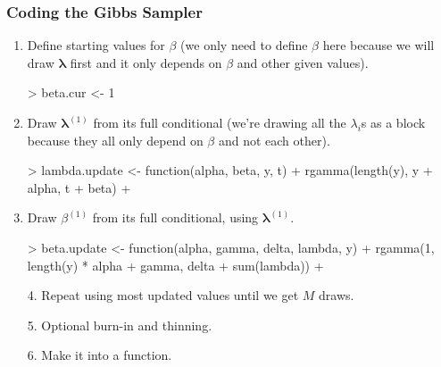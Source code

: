 \documentclass{beamer}
\begin{document}
\begin{frame}[fragile]
\frametitle{Coding the Gibbs Sampler}
\pause
\begin{enumerate}
\item Define starting values for $\beta$ \pause (we only need to define
$\beta$ here because we will draw $\bm{\lambda}$ first and it only
depends on $\beta$ and other given values).
\pause
\tiny
\medskip
\begin{Schunk}
\begin{Sinput}
> beta.cur <- 1
\end{Sinput}
\end{Schunk}
\bigskip
\normalsize
\pause
\item Draw $\bm{\lambda}^{(1)}$ from its full conditional \pause (we're
drawing all the $\lambda_i$s as a block because they all only depend
on $\beta$ and not each other). 
\tiny
\medskip
\pause
\begin{Schunk}
\begin{Sinput}
> lambda.update <- function(alpha, beta, y, t) {
+     rgamma(length(y), y + alpha, t + beta)
+ }
\end{Sinput}
\end{Schunk}
\normalsize
\bigskip
\pause
\item Draw $\beta^{(1)}$ from its full conditional, using $\bm{\lambda}^{(1)}$.
\medskip
\tiny
\pause
\begin{Schunk}
\begin{Sinput}
> beta.update <- function(alpha, gamma, delta, lambda, y) {
+     rgamma(1, length(y) * alpha + gamma, delta + sum(lambda))
+ }
\end{Sinput}
\end{Schunk}
\normalsize
\end{enumerate}

\end{frame}

\begin{frame}[fragile]
\begin{enumerate}
\item [4.] Repeat using most updated values until we get $M$ draws.
\pause
\bigskip
\item [5.] Optional burn-in and thinning.
\bigskip
\pause
\item [6.] Make it into a function.
\end{enumerate}
\end{frame}
\end{document}

